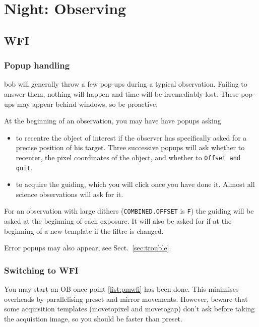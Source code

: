 \documentclass[11pt,fleqn]{book} %
\begin{document}

\chapter{Night: Observing}
\label{nightops}

\section{WFI}

\subsection{Popup handling}

\gls{bob} will generally throw a few pop-ups during a typical observation. Failing 
to answer them, nothing will happen and time will be irremediably lost.  These pop-ups may appear behind windows, so be proactive.

At the beginning of an observation, you may have have popups asking
\begin{itemize}
    \item to recentre the object of interest if the observer has specifically
    asked for a precise position of his target.  Three successive popups will
    ask whether to recenter, the pixel coordinates of the object, and whether
    to \texttt{Offset and quit}.
    \item to acquire the guiding, which you will click once you have done it. 
    Almost all science observations will ask  for it.
\end{itemize}

For an observation with large dithers (\texttt{COMBINED.OFFSET} is \texttt{F}) the
guiding will be asked at the beginning of each exposure.  It will also be asked for if at the beginning of a new template if the filtre is changed.

Error popups may also appear, see Sect.~\ref{sec:trouble}.

\subsection{Switching to WFI}

You may start an OB once point \ref{list:pmwfi} has been done.  This minimises
overheads by parallelising preset and mirror movements.  However, beware that some acquisition templates (movetopixel and movetogap) don't ask before taking the acquistion image, so you should be faster than preset.  
\end{document}

